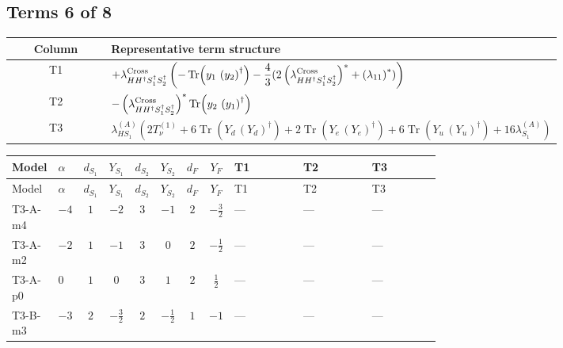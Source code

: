 \documentclass[8pt]{article}
\begin{document}
\begin{landscape}
\subsection*{Terms 6 of 8}
\begin{center}
\begin{tabular}{@{}c >{\raggedright\arraybackslash}p{0.82\linewidth}@{}}
\toprule
Column & Representative term structure \\
\midrule
T1 & \(\displaystyle +{\lambda_{H H^\dagger S_1^\dagger S_2^\dagger}^{\rm Cross}} \left(-\operatorname{Tr}\!\left({y_1}\,\left({y_2}\right)^{\dagger}\right)-\frac{4}{3} (2 \left({\lambda_{H H^\dagger S_1^\dagger S_2^\dagger}^{\rm Cross}}\right)^{*}+\left({\lambda_{11}}\right)^{*})\right)\) \\
\midrule
T2 & \(\displaystyle -\left({\lambda_{H H^\dagger S_1^\dagger S_2^\dagger}^{\rm Cross}}\right)^{*} \operatorname{Tr}\!\left({y_2}\,\left({y_1}\right)^{\dagger}\right)\) \\
\midrule
T3 & \(\displaystyle {\lambda_{HS_1}^{(A)}} (2 T_{\nu}^{(1)}+6 \operatorname{Tr}\!\left({Y_d}\,\left({Y_d}\right)^{\dagger}\right)+2 \operatorname{Tr}\!\left({Y_e}\,\left({Y_e}\right)^{\dagger}\right)+6 \operatorname{Tr}\!\left({Y_u}\,\left({Y_u}\right)^{\dagger}\right)+16 {\lambda_{S_1}^{(A)}})\) \\
\midrule
\bottomrule
\end{tabular}
\end{center}
\smallskip
\tiny
\begin{longtable}{@{}llcccccc >{\raggedright\arraybackslash}p{0.21\linewidth} >{\raggedright\arraybackslash}p{0.21\linewidth} >{\raggedright\arraybackslash}p{0.21\linewidth}@{}}
\toprule
Model & $\alpha$ & $d_{S_1}$ & $Y_{S_1}$ & $d_{S_2}$ & $Y_{S_2}$ & $d_F$ & $Y_F$ & T1 & T2 & T3 \\
\midrule
\endfirsthead
\toprule
Model & $\alpha$ & $d_{S_1}$ & $Y_{S_1}$ & $d_{S_2}$ & $Y_{S_2}$ & $d_F$ & $Y_F$ & T1 & T2 & T3 \\
\midrule
\endhead
T3-A-m4 & $-4$ & $1$ & $-2$ & $3$ & $-1$ & $2$ & $-\frac{3}{2}$ & --- & --- & --- \\
\midrule
T3-A-m2 & $-2$ & $1$ & $-1$ & $3$ & $0$ & $2$ & $-\frac{1}{2}$ & --- & --- & --- \\
\midrule
T3-A-p0 & $0$ & $1$ & $0$ & $3$ & $1$ & $2$ & $\frac{1}{2}$ & --- & --- & --- \\
\midrule
T3-B-m3 & $-3$ & $2$ & $-\frac{3}{2}$ & $2$ & $-\frac{1}{2}$ & $1$ & $-1$ & --- & --- & --- \\
\midrule

\end{longtable}
\end{landscape}
\end{document}
